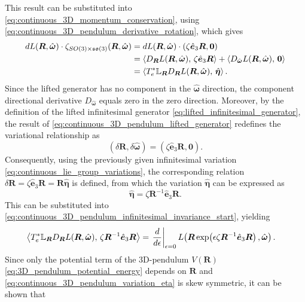 This result can be substituted into \eqref{eq:continuous_3D_momentum_conservation}, using \eqref{eq:continuous_3D_pendulum_derivative_rotation}, which gives
\begin{align}
dL(\bm{R},\hat{\bm{\omega}})\cdot
\zeta_{SO(3)\times\mathfrak{so}(3)}(\bm{R},\hat{\bm{\omega}})
&=
dL(\bm{R},\hat{\bm{\omega}})\cdot
(\zeta \hat{\bm{e}}_3\bm{R},\bm{0}) \notag\\
&=
\left\langle D_{\bm{R}}L(\bm{R},\hat{\bm{\omega}}),\,\zeta \hat{\bm{e}}_3\bm{R}\right\rangle
+
\left\langle D_{\hat{\bm{\omega}}}L(\bm{R},\hat{\bm{\omega}}),\,\bm{0}\right\rangle \notag\\
&=
\left\langle T_e^*\mathbb{L}_{\bm{R}}D_{\bm{R}}L(\bm{R},\hat{\bm{\omega}}),\,
\hat{\bm{\eta}}\right\rangle.
\label{eq:continuous_3D_pendulum_infinitesimal_invariance_start}
\end{align}
Since the lifted generator has no component in the $\hat{\bm{\omega}}$ direction, the component directional derivative $D_{\hat{\bm{\omega}}}$ equals zero in the zero direction. Moreover, by the definition of the lifted infinitesimal generator \eqref{eq:lifted_infinitesimal_generator}, the result of \eqref{eq:continuous_3D_pendulum_lifted_generator} redefines the variational relationship as
\begin{equation} \label{eq:continuous_3D_pendulum_lifted_action_generator_variation}
    (\delta \bm{R}, \delta \hat{\bm{\omega}}) = (\zeta \hat{\bm{e}}_3\bm{R},\bm{0}).
\end{equation}
Consequently, using the previously given infinitesimal variation \eqref{eq:continuous_lie_group_variations}, the corresponding relation $\delta \bm{R} = \zeta \hat{\bm{e}}_3 \bm{R} = \bm{R} \hat{\bm{\eta}}$ is defined, from which the variation $\hat{\bm{\eta}}$ can be expressed as
\begin{equation}\label{eq:continuous_3D_pendulum_variation_eta}
    \hat{\bm{\eta}}= \zeta \bm{R}^{-1} \hat{\bm{e}}_3 \bm{R}.
\end{equation}
This can be substituted into \eqref{eq:continuous_3D_pendulum_infinitesimal_invariance_start}, yielding
\begin{align}
\left\langle T_e^*\mathbb{L}_{\bm{R}}D_{\bm{R}}L(\bm{R},\hat{\bm{\omega}}),\,
\zeta \bm{R}^{-1}\hat{\bm{e}}_3\bm{R}\right\rangle
&=
\left.\frac{d}{d\epsilon}\right|_{\epsilon=0}
L\!\left(\bm{R}\exp\!\left(\epsilon \zeta \bm{R}^{-1}\hat{\bm{e}}_3\bm{R}\right),\hat{\bm{\omega}}\right).
\notag
\end{align}
Since only the potential term of the 3D-pendulum $V(\bm{R})$ \eqref{eq:3D_pendulum_potential_energy} depends on $\bm{R}$ and \eqref{eq:continuous_3D_pendulum_variation_eta} is skew symmetric, it can be shown that 
